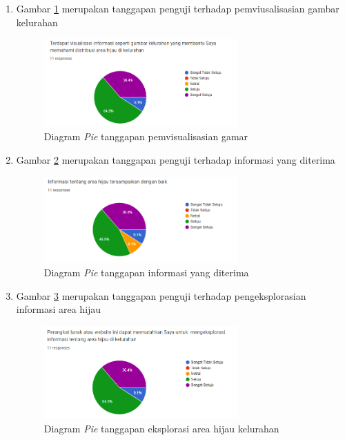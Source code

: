 \begin{enumerate}
	\item Gambar \ref{fig:respon4} merupakan tanggapan penguji terhadap pemviusalisasian gambar kelurahan\\
	\begin{figure}[H]
		\centering
		\includegraphics[width=0.7\textwidth]{Gambar/respon4.png}
		\caption{Diagram \textit{Pie} tanggapan pemvisualisasian gamar}
		\label{fig:respon4}
	\end{figure}
	
	\item Gambar \ref{fig:respon5} merupakan tanggapan penguji terhadap informasi yang diterima\\
	\begin{figure}[H]
		\centering
		\includegraphics[width=0.7\textwidth]{Gambar/respon5.png}
		\caption{Diagram \textit{Pie} tanggapan informasi yang diterima}
		\label{fig:respon5}
	\end{figure}

	
	\item Gambar \ref{fig:respon6} merupakan tanggapan penguji terhadap pengeksplorasian informasi area hijau\\
	\begin{figure}[H]
		\centering
		\includegraphics[width=0.7\textwidth]{Gambar/respon6.png}
		\caption{Diagram \textit{Pie} tanggapan eksplorasi area hijau  kelurahan}
		\label{fig:respon6}
	\end{figure}
	

\end{enumerate}
